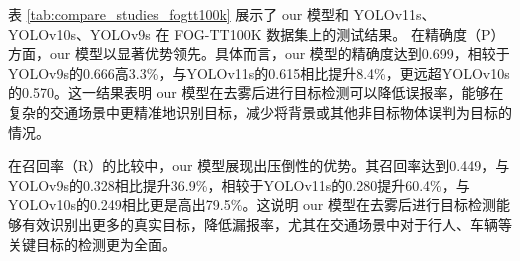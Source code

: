 表 \ref{tab:compare_studies_fogtt100k} 展示了 our 模型和 YOLOv11s、YOLOv10s、YOLOv9s 在 FOG-TT100K 数据集上的测试结果。
在精确度（P）方面，our 模型以显著优势领先。具体而言，our 模型的精确度达到0.699，相较于YOLOv9s的0.666高3.3\%，与YOLOv11s的0.615相比提升8.4\%，更远超YOLOv10s的0.570。这一结果表明 our 模型在去雾后进行目标检测可以降低误报率，能够在复杂的交通场景中更精准地识别目标，减少将背景或其他非目标物体误判为目标的情况。

在召回率（R）的比较中，our 模型展现出压倒性的优势。其召回率达到0.449，与YOLOv9s的0.328相比提升36.9\%，相较于YOLOv11s的0.280提升60.4\%，与YOLOv10s的0.249相比更是高出79.5\%。这说明 our 模型在去雾后进行目标检测能够有效识别出更多的真实目标，降低漏报率，尤其在交通场景中对于行人、车辆等关键目标的检测更为全面。

\begin{figure}[H]
    \centering
         \\
\end{figure}
